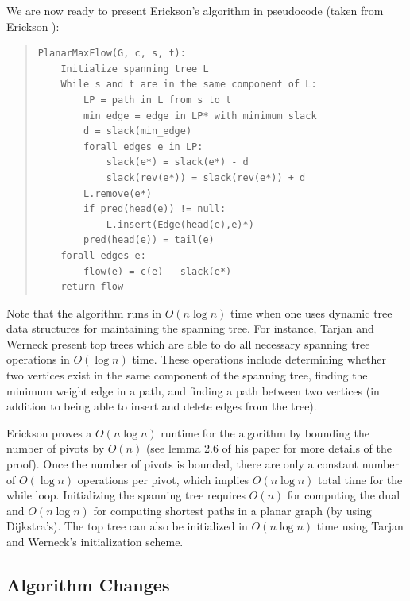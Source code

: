 \documentclass[12pt]{article}
\begin{document}
We are now ready to present Erickson's algorithm in pseudocode (taken from Erickson \cite{erickson2010}):
\begin{quote}
\begin{verbatim}
PlanarMaxFlow(G, c, s, t):
    Initialize spanning tree L
    While s and t are in the same component of L:
        LP = path in L from s to t
        min_edge = edge in LP* with minimum slack
        d = slack(min_edge)
        forall edges e in LP:
            slack(e*) = slack(e*) - d
            slack(rev(e*)) = slack(rev(e*)) + d
        L.remove(e*)
        if pred(head(e)) != null:
            L.insert(Edge(head(e),e)*)
        pred(head(e)) = tail(e)
    forall edges e:
        flow(e) = c(e) - slack(e*)
    return flow
\end{verbatim}
\end{quote}

Note that the algorithm runs in $O(n \log n)$ time when one uses dynamic tree data structures for maintaining the spanning tree. For instance, Tarjan and Werneck \cite{tarjanwerneck2005} present top trees which are able to do all necessary spanning tree operations in $O(\log n)$ time. These operations include determining whether two vertices exist in the same component of the spanning tree, finding the minimum weight edge in a path, and finding a path between two vertices (in addition to being able to insert and delete edges from the tree). 

Erickson proves a $O(n \log n)$ runtime for the algorithm by bounding the number of pivots by $O(n)$ (see lemma 2.6 of his paper for more details of the proof). Once the number of pivots is bounded, there are only a constant number of $O(\log n)$ operations per pivot, which implies $O(n \log n)$ total time for the while loop. Initializing the spanning tree requires $O(n)$ for computing the dual and $O(n \log n)$ for computing shortest paths in a planar graph (by using Dijkstra's). The top tree can also be initialized in $O(n \log n)$ time using Tarjan and Werneck's initialization scheme.

\subsection{Algorithm Changes}
\end{document}
